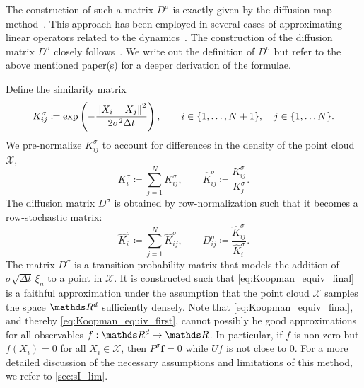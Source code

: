 The construction of such a matrix $D^\sigma$ is exactly given by the diffusion map method~\parencite{coifmanDiffusionMaps2006}. This approach has been employed in several cases of approximating linear operators related to the dynamics~\parencite{berryNonparametricForecastingLowdimensional2015,froylandSpectralAnalysisClimate2021,froylandRevealingTrendsPersistent2024}. The construction of the diffusion matrix $D^\sigma$ closely follows~\textcite{coifmanDiffusionMaps2006}. We write out the definition of $D^\sigma$ but refer to the above mentioned paper(s) for a deeper derivation of the formulae.

Define the similarity matrix
\begin{equation} \label{eq:simiMat}
    K^\sigma_{ij} \coloneqq \exp\left(-\frac{\left\lVert X_i - X_j\right\rVert^2}{2\sigma^2 \Delta t} \right), \qquad i \in \{1, \hdots, N+1\}, \quad j\in \{1, \hdots N\}.
\end{equation}
We pre-normalize $K^\sigma_{ij}$ to account for differences in the density of the point cloud $\mathcal{X}$,
\begin{equation}
    K_i^\sigma \coloneqq \sum_{j=1}^N K^\sigma_{ij}, \qquad \hat{K}^\sigma_{ij} \coloneqq \frac{K^\sigma_{ij}}{K_j^\sigma}.
\end{equation}
The diffusion matrix $D^\sigma$ is obtained by row-normalization such that it becomes a row-stochastic matrix:
\begin{equation*}
    \hat{K}_i^\sigma \coloneqq \sum_{j
        =1}^N \hat{K}^\sigma_{ij}, \qquad D_{ij}^\sigma \coloneqq \frac{\hat{K}^\sigma_{ij}}{\hat{K}_i^\sigma}.
\end{equation*}
The matrix $D^\sigma$ is a transition probability matrix that models the addition of $\sigma \sqrt{\Delta t} \, \xi_n$ to a point in $\mathcal{X}$. It is constructed such that \cref{eq:Koopman_equiv_final} is a faithful approximation under the assumption that the point cloud $\mathcal{X}$ samples the space $\R^d$ sufficiently densely. Note that \cref{eq:Koopman_equiv_final}, and thereby \cref{eq:Koopman_equiv_first}, cannot possibly be good approximations for all observables $f:\R^d \to \R$. In particular, if $f$ is non-zero but $f(X_i) = 0$ for all $X_i\in \mathcal{X}$, then $P^\sigma \mathbf{f} = 0$ while $U f$ is not close to 0. For a more detailed discussion of the necessary assumptions and limitations of this method, we refer to \cref{sec:sI_lim}.

